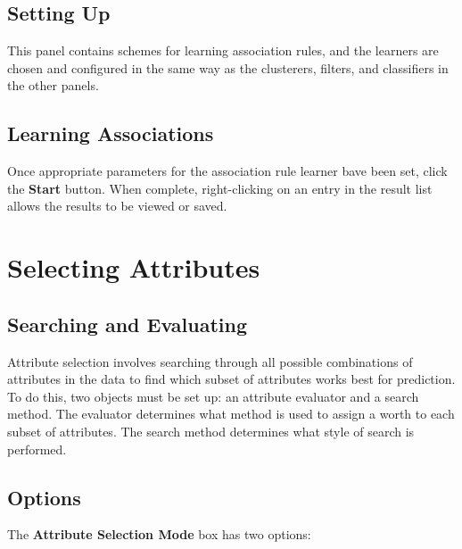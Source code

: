 \documentclass[a4paper]{article}
\begin{document}
\begin{center}
\end{center}

\subsection{Setting Up}

This panel contains schemes for learning association rules, and the
learners are chosen and configured in the same way as the clusterers,
filters, and classifiers in the other panels.

\subsection{Learning Associations}

Once appropriate parameters for the association rule learner bave been
set, click the \textbf{Start} button.  When complete, right-clicking
on an entry in the result list allows the results to be viewed or
saved.

\newpage

\section{Selecting Attributes}

\begin{center}
\end{center}

\subsection{Searching and Evaluating}

Attribute selection involves searching through all possible combinations of
attributes in the data to find which subset of attributes works best for
prediction.  To do this, two objects must be set up: an attribute evaluator and
a search method.  The evaluator determines what method is used to assign a
worth to each subset of attributes.  The search method determines what style of
search is performed.

\subsection{Options}

The \textbf{Attribute Selection Mode} box has two options:
\end{document}
